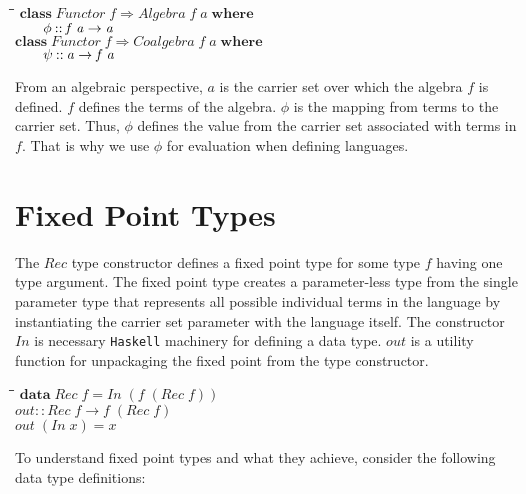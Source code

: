 \documentclass[11pt]{article}
\newlength{\lwidth}\setlength{\lwidth}{4.5cm}
\newlength{\cwidth}\setlength{\cwidth}{8mm} %
\newcommand{\Conid}[1]{\mathit{#1}}
\newcommand{\Varid}[1]{\mathit{#1}}
\begin{document}
\begin{tabbing}
\qquad\=\hspace{\lwidth}\=\hspace{\cwidth}\=\+\kill
${\mathbf{class}\;\Conid{Functor}\;\Varid{f}\Rightarrow \Conid{Algebra}\;\Varid{f}\;\Varid{a}\;\mathbf{where}}$\\
${\hskip2.00em\relax\Varid{\phi}\mathbin{::}\Varid{f}\;\Varid{a}\to \Varid{a}}$\\
${}$\\
${\mathbf{class}\;\Conid{Functor}\;\Varid{f}\Rightarrow \Conid{Coalgebra}\;\Varid{f}\;\Varid{a}\;\mathbf{where}}$\\
${\hskip2.00em\relax\Varid{\psi}\mathbin{::}\Varid{a}\to \Varid{f}\;\Varid{a}}$
\end{tabbing}
From an algebraic perspective, \ensuremath{\Varid{a}} is the carrier set over which the
algebra \ensuremath{\Varid{f}} is defined.  \ensuremath{\Varid{f}} defines the terms of the algebra.  \ensuremath{\Varid{\phi}}
is the mapping from terms to the carrier set.  Thus, \ensuremath{\Varid{\phi}} defines the
value from the carrier set associated with terms in \ensuremath{\Varid{f}}.  That is why we
use \ensuremath{\Varid{\phi}} for evaluation when defining languages.

\section{Fixed Point Types}

The \ensuremath{\Conid{Rec}} type constructor defines a fixed point type for some type
\ensuremath{\Varid{f}} having one type argument.  The fixed point type creates a
parameter-less type from the single parameter type that represents all
possible individual terms in the language by instantiating the carrier
set parameter with the language itself.  The constructor \ensuremath{\Conid{In}} is
necessary \texttt{Haskell} machinery for defining a data type.  \ensuremath{\Varid{out}}
is a utility function for unpackaging the fixed point from the type
constructor.

\begin{tabbing}
\qquad\=\hspace{\lwidth}\=\hspace{\cwidth}\=\+\kill
${\mathbf{data}\;\Conid{Rec}\;\Varid{f}\mathrel{=}\Conid{In}\;(\Varid{f}\;(\Conid{Rec}\;\Varid{f}))}$\\
${\Varid{out}\mathbin{::}\Conid{Rec}\;\Varid{f}\to \Varid{f}\;(\Conid{Rec}\;\Varid{f})}$\\
${\Varid{out}\;(\Conid{In}\;\Varid{x})\mathrel{=}\Varid{x}}$
\end{tabbing}
To understand fixed point types and what they achieve, consider the
following data type definitions:
\end{document}
